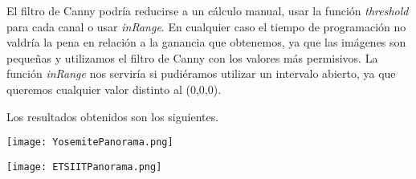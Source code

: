 \documentclass[a4paper, 11pt]{article}
\theoremstyle{definition}
\begin{document}
    El filtro de Canny podría reducirse a un cálculo manual, usar la función \textit{threshold} para cada canal
    o usar \textit{inRange}. En cualquier caso el tiempo de programación no valdría la pena
    en relación a la ganancia que obtenemos, ya que las imágenes son pequeñas y utilizamos el filtro de Canny con
    los valores más permisivos. La función \textit{inRange} nos serviría si pudiéramos utilizar un intervalo abierto,
    ya que queremos cualquier valor distinto al (0,0,0).

    Los resultados obtenidos son los siguientes.

    \centerline{\texttt{[image: YosemitePanorama.png]}}
    \centerline{\texttt{[image: ETSIITPanorama.png]}}
\end{document}
